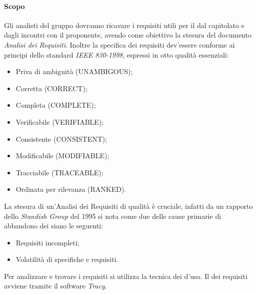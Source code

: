 			\paragraph*{Scopo}
				Gli analisti del gruppo dovranno ricavare i requisiti utili per il 
				dal capitolato e dagli incontri con il proponente, avendo come obiettivo la
				stesura del documento \textit{Analisi dei Requisiti}.
			        Inoltre la specifica dei requisiti dev'essere conforme ai principi dello standard \textit{IEEE 830-1998}, espressi in otto qualit\`a
			        essenziali:
				\begin{itemize}
				\item Priva di ambiguit\`a (UNAMBIGOUS);
				\item Corretta (CORRECT);
				\item Completa (COMPLETE);
				\item Verificabile (VERIFIABLE);
				\item Consistente (CONSISTENT);
				\item Modificabile (MODIFIABLE);
				\item Tracciabile (TRACEABLE);
				\item Ordinata per rilevanza (RANKED).
				\end{itemize}
			        La stesura di un'Analisi dei Requisiti di qualit\`a \`e cruciale, infatti
			        da un rapporto dello \textit{Standish Group} del 1995 si nota come due delle cause primarie
			        di abbandono dei  siano le seguenti:
				\begin{itemize}
				\item Requisiti incompleti;
				\item Volatilità di specifiche e requisiti.
				\end{itemize}
				Per analizzare e trovare i requisiti si utilizza la tecnica dei  d’uso. Il  dei requisiti avviene 
			        tramite il software \textit{Tracy}.
			
